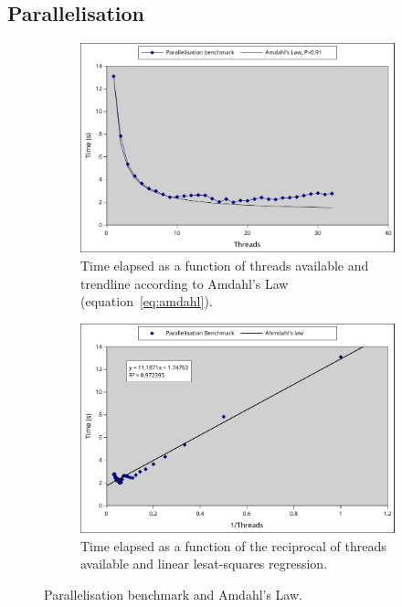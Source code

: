 \subsection{Parallelisation}
\label{ssub:parallelisation}

\begin{figure}
   \centering
   \begin{subfigure}[b]{0.4\textwidth}
   \centering
   \includegraphics[width=\linewidth]{figures/parallel1.pdf}
   \caption{Time elapsed as a function of threads available and trendline according to Amdahl's Law (equation~\ref{eq:amdahl}).}
   \label{fig:parallel1}
   \end{subfigure}\quad\begin{subfigure}[b]{0.4\textwidth}
   \centering
   \includegraphics[width=\linewidth]{figures/parallel2.pdf}
       \caption{Time elapsed as a function of the reciprocal of threads available and linear lesat-squares regression.}
   \label{fig:parallel2}
   \end{subfigure}
   \caption{Parallelisation benchmark and Amdahl's Law.}
\end{figure}

